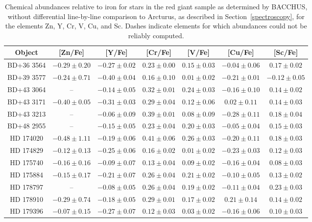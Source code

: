 \begin{table*}
\caption{Chemical abundances relative to iron for stars in the red giant sample as determined by BACCHUS, without differential line-by-line comparison to Arcturus, as described in Section~\ref{spectroscopy}, for the elements Zn, Y, Cr, V, Cu, and Sc. Dashes indicate elements for which abundances could not be reliably computed.\label{elems3}}
\begin{tabular}{ccccccc}
\hline \hline
Object & [Zn/Fe] & [Y/Fe] & [Cr/Fe] & [V/Fe] & [Cu/Fe] & [Sc/Fe] \\
\hline
BD+36 3564 & $-0.29 \pm 0.20$ & $-0.27 \pm 0.02$ & $0.23 \pm 0.00$ & $0.15 \pm 0.03$ & $-0.04 \pm 0.06$ & $0.17 \pm 0.02$ \\
BD+39 3577 & $-0.24 \pm 0.71$ & $-0.40 \pm 0.04$ & $0.16 \pm 0.10$ & $0.01 \pm 0.02$ & $-0.21 \pm 0.01$ & $-0.12 \pm 0.05$ \\
BD+43 3064 & -- & $-0.14 \pm 0.05$ & $0.32 \pm 0.01$ & $0.24 \pm 0.03$ & $-0.16 \pm 0.10$ & $0.14 \pm 0.02$ \\
BD+43 3171 & $-0.40 \pm 0.05$ & $-0.31 \pm 0.03$ & $0.29 \pm 0.04$ & $0.12 \pm 0.06$ & $0.02 \pm 0.11$ & $0.14 \pm 0.03$ \\
BD+43 3213 & -- & $-0.06 \pm 0.09$ & $0.39 \pm 0.01$ & $0.08 \pm 0.09$ & $-0.28 \pm 0.11$ & $0.18 \pm 0.04$ \\
BD+48 2955 & -- & $-0.15 \pm 0.05$ & $0.23 \pm 0.04$ & $0.20 \pm 0.03$ & $-0.05 \pm 0.04$ & $0.15 \pm 0.03$ \\
HD 174020 & $-0.48 \pm 1.11$ & $-0.19 \pm 0.06$ & $0.41 \pm 0.06$ & $0.26 \pm 0.03$ & $-0.20 \pm 0.11$ & $0.18 \pm 0.03$ \\
HD 174829 & $-0.12 \pm 0.13$ & $-0.25 \pm 0.06$ & $0.16 \pm 0.02$ & $0.01 \pm 0.02$ & $-0.23 \pm 0.03$ & $0.12 \pm 0.03$ \\
HD 175740 & $-0.16 \pm 0.16$ & $-0.09 \pm 0.07$ & $0.13 \pm 0.04$ & $0.09 \pm 0.02$ & $-0.16 \pm 0.04$ & $0.08 \pm 0.03$ \\
HD 175884 & $-0.15 \pm 0.17$ & $-0.21 \pm 0.07$ & $0.26 \pm 0.04$ & $0.21 \pm 0.02$ & $-0.10 \pm 0.05$ & $0.13 \pm 0.02$ \\
HD 178797 & -- & $-0.08 \pm 0.05$ & $0.26 \pm 0.04$ & $0.19 \pm 0.02$ & $-0.11 \pm 0.04$ & $0.23 \pm 0.03$ \\
HD 178910 & $-0.29 \pm 0.74$ & $-0.18 \pm 0.05$ & $0.29 \pm 0.01$ & $0.17 \pm 0.02$ & $0.21 \pm 0.14$ & $0.14 \pm 0.02$ \\
HD 179396 & $-0.07 \pm 0.15$ & $-0.27 \pm 0.07$ & $0.12 \pm 0.03$ & $0.03 \pm 0.02$ & $-0.16 \pm 0.06$ & $0.10 \pm 0.03$ \\

\end{tabular}
\end{table*}
